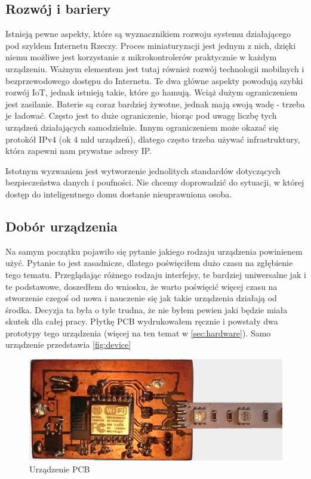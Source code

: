 \subsection{Rozwój i bariery}
Istnieją pewne aspekty, które są wyznacznikiem rozwoju systemu działającego pod szyldem Internetu Rzeczy. Proces miniaturyzacji jest jednym z nich, dzięki niemu możliwe jest korzystanie z mikrokontrolerów praktycznie w każdym urządzeniu. Ważnym elementem jest tutaj również rozwój technologii mobilnych i bezprzewodowego dostępu do Internetu. Te dwa główne aspekty powodują szybki rozwój IoT, jednak istnieją takie, które go hamują. Wciąż dużym ograniczeniem jest zasilanie. Baterie są coraz bardziej żywotne, jednak mają swoją wadę - trzeba je ładować. Często jest to duże ograniczenie, biorąc pod uwagę liczbę tych urządzeń działających samodzielnie. Innym ograniczeniem może okazać się protokół IPv4 (ok 4 mld urządzeń), dlatego często trzeba używać infrastruktury, która zapewni nam prywatne adresy IP. 

Istotnym wyzwaniem jest wytworzenie jednolitych standardów dotyczących bezpieczeństwa danych i poufności. Nie chcemy doprowadzić do sytuacji, w której dostęp do inteligentnego domu dostanie nieuprawniona osoba. 

\subsection{Dobór urządzenia}
Na samym początku pojawiło się pytanie jakiego rodzaju urządzenia powinienem użyć. Pytanie to jest zasadnicze, dlatego poświęciłem dużo czasu na zgłębienie tego tematu. Przeglądając różnego rodzaju interfejsy, te bardziej uniwersalne jak i te podstawowe, doszedłem do wniosku, że warto poświęcić więcej czasu na stworzenie czegoś od nowa i nauczenie się jak takie urządzenia działają od środka. Decyzja ta była o tyle trudna, że nie byłem pewien jaki będzie miała skutek dla całej pracy. Płytkę PCB wydrukowałem ręcznie i powstały dwa prototypy tego urządzenia (więcej na ten temat w \autoref{sec:hardware}). Samo urządzenie przedstawia \autoref{fig:device}
\begin{figure}[!htbp]
	\centering
	\includegraphics[width=1.0\textwidth]{images/device.png}
	\caption[Urządzenie PCB.]{Urządzenie PCB}
	\label{fig:device}
\end{figure}

